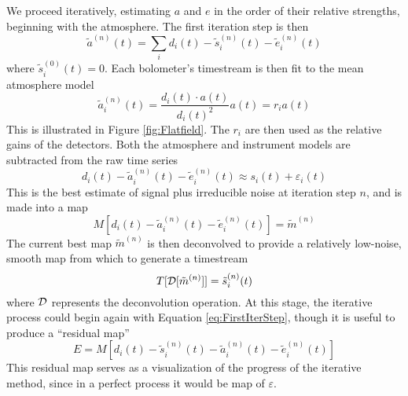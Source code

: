 \documentclass{emulateapj}
\newcommand{\epsi}{\varepsilon}
\begin{document}
We proceed iteratively, estimating $a$ and $e$ in the order of their
relative strengths, beginning with the atmosphere.  The first
iteration step is then
\begin{equation}
\label{eq:FirstIterStep}
\tilde{a}^{(n)}(t) = 
\sum_i{d_i(t)-\tilde{s}^{(n)}_i(t) - \tilde{e}^{(n)}_i(t)}
\end{equation}
where $\tilde{s}^{(0)}_i(t)=0$.   Each bolometer's timestream is then 
fit to the mean atmosphere model 
\begin{equation}
\label{eq:MeanAtmosphere}
\tilde{a}^{(n)}_i(t) = \frac{d_i(t) \cdot a(t)}{d_i(t)^2} a(t) = r_i a(t)
\end{equation}
This is illustrated in Figure \ref{fig:Flatfield}.  The $r_i$ are then
used as the relative gains of the detectors.
Both the atmosphere and instrument models are subtracted from the
raw time series
\begin{equation}
\label{eq:SignalEstimate}
d_i(t) - \tilde{a}^{(n)}_i(t) - \tilde{e}^{(n)}_i(t)
\approx s_i(t) + \epsi_i(t)
\end{equation}
This is the best estimate of signal plus irreducible noise at
iteration step $n$, and is made into a map
\begin{equation}
M[d_i(t) - \tilde{a}^{(n)}_i(t) - \tilde{e}^{(n)}_i(t)] = \tilde{m}^{(n)}
\end{equation}
The current best map $\tilde{m}^{(n)}$ is then deconvolved to provide
a relatively low-noise, smooth map from which to generate a timestream
\begin{equation}
\label{eq:MapToTime}
T[{\cal D}[\tilde{m}^{(n)}]] = \tilde{s}^{(n)}_i(t)
\end{equation}
where ${\cal D}$ represents the deconvolution operation.  At this
stage, the iterative process could begin again with Equation
\ref{eq:FirstIterStep}, though it is useful to produce a
``residual map''
\begin{equation}
\label{eq:ResidualMap}
E = M[d_i(t) - \tilde{s}^{(n)}_i(t) - \tilde{a}^{(n)}_i(t) - 
\tilde{e}^{(n)}_i(t)]
\end{equation}
This residual map serves as a visualization of the progress of the
iterative method, since in a perfect process it would be map of
$\epsi$.
\end{document}
